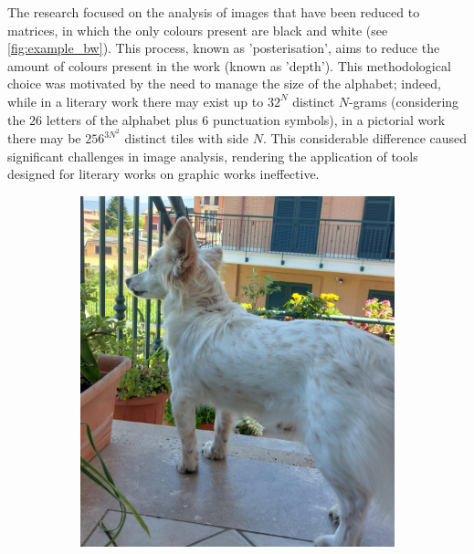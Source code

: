 \noindent The research focused on the analysis of images that have been reduced to matrices, in which the only colours present are black and white (see \cref{fig:example_bw}). This process, known as 'posterisation', aims to reduce the amount of colours present in the work (known as 'depth'). This methodological choice was motivated by the need to manage the size of the alphabet; indeed, while in a literary work there may exist up to $32^N$ distinct $N$-grams (considering the $26$ letters of the alphabet plus $6$ punctuation symbols), in a pictorial work there may be $256^{3N^2}$ distinct tiles with side $N$. This considerable difference caused significant challenges in image analysis, rendering the application of tools designed for literary works on graphic works ineffective.

\begin{figure}[ht]
	\centering
	\begin{subfigure}{0.4\linewidth}
		\includegraphics[width=\linewidth]{Figures/example.jpeg}
	\end{subfigure}
	\hspace{2cm}
	\begin{subfigure}{0.4\linewidth}

\end{subfigure}
\end{figure}
